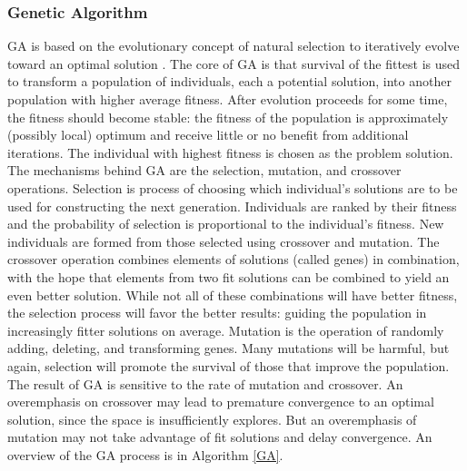 \documentclass{tamuccthesis}
\begin{document}
\subsubsection{Genetic Algorithm}

GA is based on the evolutionary concept of natural selection to iteratively evolve toward an optimal solution \cite{ga:cao:2016}. The core of GA is that survival of the fittest is used to transform a population of individuals, each a potential solution, into another population with higher average fitness. After evolution proceeds for some time, the fitness should become stable: the fitness of the population is approximately (possibly local) optimum and receive little or no benefit from additional iterations. The individual with highest fitness is chosen as the problem solution. The mechanisms behind GA are the selection, mutation, and crossover operations. Selection is process of choosing which individual's solutions are to be used for constructing the next generation. Individuals are ranked by their fitness and the probability of selection is proportional to the individual's fitness. New individuals are formed from those selected using crossover and mutation. The crossover operation combines elements of solutions (called genes) in combination, with the hope that elements from two fit solutions can be combined to yield an even better solution. While not all of these combinations will have better fitness, the selection process will favor the better results: guiding the population in increasingly fitter solutions on average. Mutation is the operation of randomly adding, deleting, and transforming genes. Many mutations will be harmful, but again, selection will promote the survival of those that improve the population. The result of GA is sensitive to the rate of mutation and crossover. An overemphasis on crossover may lead to premature convergence to an optimal solution, since the space is insufficiently explores. But an overemphasis of mutation may not take advantage of fit solutions and delay convergence. An overview of the GA process is in Algorithm \ref{GA}.
\end{document}
